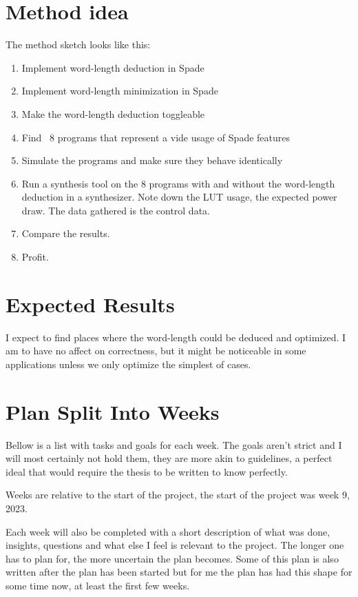 \documentclass[msc,lith,english]{liuthesis}
\begin{document}
\section{Method idea}
The method sketch looks like this:
\begin{enumerate}
  \item Implement word-length deduction in Spade
  \item Implement word-length minimization in Spade
  \item Make the word-length deduction toggleable
  \item Find ~8 programs that represent a vide usage of Spade features
  \item Simulate the programs and make sure they behave identically
  \item Run a synthesis tool on the 8 programs with and without the word-length deduction in a synthesizer. Note down the LUT usage, the expected power draw. The data gathered is the control data.
  \item Compare the results.
  \item Profit.
\end{enumerate}

\section{Expected Results}
I expect to find places where the word-length could be deduced and optimized. I am to have no affect on correctness, but it might be noticeable in some applications unless we only optimize the simplest of cases.

\newpage
\section{Plan Split Into Weeks}
Bellow is a list with tasks and goals for each week. The goals aren't strict and I will most certainly not hold them, they are more akin to guidelines, a perfect ideal that would require the thesis to be written to know perfectly. 

Weeks are relative to the start of the project, the start of the project was week 9, 2023.

Each week will also be completed with a short description of what was done, insights, questions and what else I feel is relevant to the project. The longer one has to plan for, the more uncertain the plan becomes. Some of this plan is also written after the plan has been started but for me the plan has had this shape for some time now, at least the first few weeks.
\end{document}
